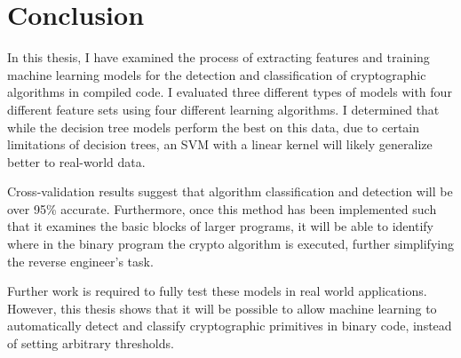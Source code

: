 \chapter{Conclusion}

In this thesis, I have examined the process of extracting features and training machine learning models for the detection and classification of cryptographic algorithms in compiled code.  I evaluated three different types of models with four different feature sets using four different learning algorithms.  I determined that while the decision tree models perform the best on this data, due to certain limitations of decision trees, an SVM with a linear kernel will likely generalize better to real-world data.

Cross-validation results suggest that algorithm classification and detection will be over 95\% accurate.  Furthermore, once this method has been implemented such that it examines the basic blocks of larger programs, it will be able to identify where in the binary program the crypto algorithm is executed, further simplifying the reverse engineer's task.

Further work is required to fully test these models in real world applications.  However, this thesis shows that it will be possible to allow machine learning to automatically detect and classify cryptographic primitives in binary code, instead of setting arbitrary thresholds.